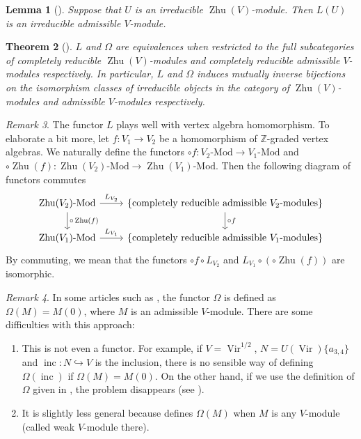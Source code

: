 \documentclass[a4paper, 12pt, reqno]{amsart}
\newtheorem{theorem}{Theorem}[section]
\newtheorem{lemma}[theorem]{Lemma}
\theoremstyle{remark}
\newtheorem{remark}[theorem]{Remark}
\DeclareMathOperator{\Vir}{Vir}
\DeclareMathOperator{\Zhu}{Zhu}
\DeclareMathOperator{\inc}{inc}
\begin{document}
\begin{lemma}[{\cite[Lemma 7.1]{dong_twisted_1998}}]
  \label{lmm:22}
  Suppose that $U$ is an irreducible $\Zhu(V)$-module.
  Then $L(U)$ is an irreducible admissible $V$-module.
\end{lemma}

\begin{theorem}[{\cite[Theorem 7.2]{dong_twisted_1998}}]
  \label{thr:40}
  $L$ and $\Omega$ are equivalences when restricted to the full subcategories of completely reducible $\Zhu(V)$-modules and completely reducible admissible $V$-modules respectively.
  In particular, $L$ and $\Omega$ induces mutually inverse bijections on the isomorphism classes of irreducible objects in the category of $\Zhu(V)$-modules and admissible $V$-modules respectively.
\end{theorem}

\begin{remark}
  \label{rmk:34}
  The functor $L$ plays well with vertex algebra homomorphism.
  To elaborate a bit more, let $f: V_1 \to V_2$ be a homomorphism of $\mathbb{Z}$-graded vertex algebras.
  We naturally define the functors $\circ f: \text{$V_2$-Mod} \to \text{$V_1$-Mod}$ and $\circ \Zhu(f): \text{$\Zhu(V_2)$-Mod} \to \text{$\Zhu(V_1)$-Mod}$.
  Then the following diagram of functors commutes
  \begin{equation*}
    \begin{tikzcd}
      \text{$\Zhu(V_2)$-Mod} \arrow[r, "L_{V_2}"] \arrow[d, "\circ \Zhu(f)"] & \{\text{completely reducible admissible $V_2$-modules}\} \arrow[d, "\circ f"] \\
      \text{$\Zhu(V_1)$-Mod} \arrow[r, "L_{V_1}"]                           & \{\text{completely reducible admissible $V_1$-modules}\}
    \end{tikzcd}
  \end{equation*}
  By commuting, we mean that the functors $\circ f \circ L_{V_2}$ and $L_{V_1} \circ(\circ\Zhu(f))$ are isomorphic.
\end{remark}

\begin{remark}
  \label{rmk:35}
  In some articles such as \cite[\S2]{de_sole_finite_2006}, the functor $\Omega$ is defined as $\Omega(M) = M(0)$, where $M$ is an admissible $V$-module.
  There are some difficulties with this approach:
  \begin{enumerate}
  \item This is not even a functor.
    For example, if $V = \Vir^{1/2}$, $N = U(\Vir)\{a_{3, 4}\}$ and $\inc: N \hookrightarrow V$ is the inclusion, there is no sensible way of defining $\Omega(\inc)$ if $\Omega(M) = M(0)$.
    On the other hand, if we use the definition of $\Omega$ given in \cite{dong_twisted_1998}, the problem disappears (see ).
  \item It is slightly less general because \cite{dong_twisted_1998} defines $\Omega(M)$ when $M$ is any $V$-module (called weak $V$-module there).
  \end{enumerate}
\end{remark}
\end{document}
